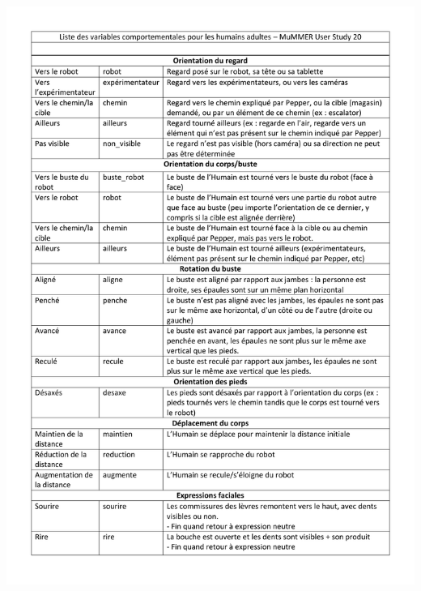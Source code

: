 \begin{center}
	\includegraphics[page=1, width=\textwidth]{figures/annexe1/HUMAINrepertoirecomportemental_MuMMER.pdf} 
\end{center}

